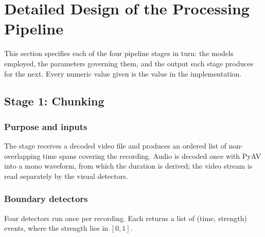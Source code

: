 \section{Detailed Design of the Processing Pipeline}

This section specifies each of the four pipeline stages in turn: the models employed,
the parameters governing them, and the output each stage produces for the next. Every
numeric value given is the value in the implementation.

\subsection{Stage 1: Chunking}

\subsubsection*{Purpose and inputs}

The stage receives a decoded video file and produces an ordered list of non-overlapping
time spans covering the recording. Audio is decoded once with PyAV into a mono waveform,
from which the duration is derived; the video stream is read separately by the visual
detectors.

\subsubsection*{Boundary detectors}

Four detectors run once per recording. Each returns a list of
(time, strength) events, where the strength lies in $[0,1]$.


